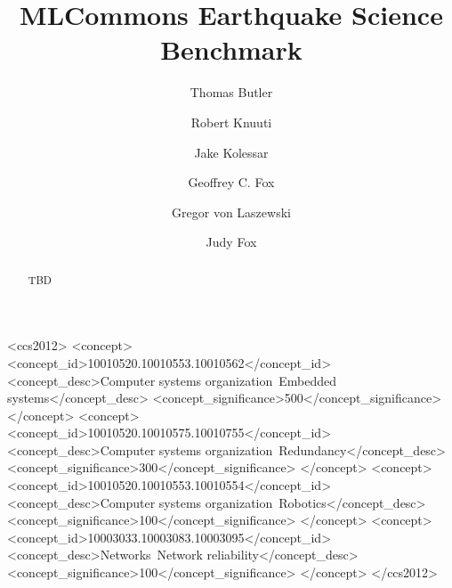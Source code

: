 \documentclass[sigplan,screen]{acmart}
\begin{document}
\title{MLCommons Earthquake Science Benchmark}

\author{Thomas Butler}

\author{Robert Knuuti}

\author{Jake Kolessar}

\author{Geoffrey C. Fox}

\author{Gregor von Laszewski}

\author{Judy Fox}

\renewcommand{\shortauthors}{Butler, Knuuti, Kolesar, G Fox, G von Laszewski}

\begin{abstract}
TBD
\end{abstract}



\begin{CCSXML}
<ccs2012>
 <concept>
  <concept_id>10010520.10010553.10010562</concept_id>
  <concept_desc>Computer systems organization~Embedded systems</concept_desc>
  <concept_significance>500</concept_significance>
 </concept>
 <concept>
  <concept_id>10010520.10010575.10010755</concept_id>
  <concept_desc>Computer systems organization~Redundancy</concept_desc>
  <concept_significance>300</concept_significance>
 </concept>
 <concept>
  <concept_id>10010520.10010553.10010554</concept_id>
  <concept_desc>Computer systems organization~Robotics</concept_desc>
  <concept_significance>100</concept_significance>
 </concept>
 <concept>
  <concept_id>10003033.10003083.10003095</concept_id>
  <concept_desc>Networks~Network reliability</concept_desc>
  <concept_significance>100</concept_significance>
 </concept>
</ccs2012>
\end{CCSXML}
\end{document}
